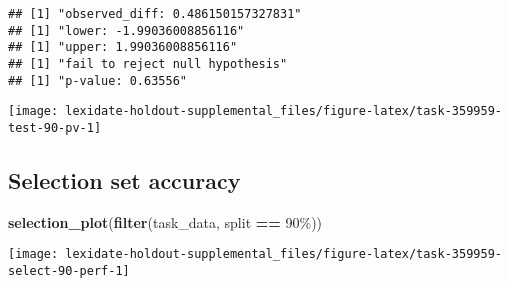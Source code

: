 \documentclass[
]{book}
\newenvironment{Shaded}{\begin{snugshade}}{\end{snugshade}}
\newcommand{\AttributeTok}[1]{\textcolor[rgb]{0.13,0.29,0.53}{#1}}
\newcommand{\DecValTok}[1]{\textcolor[rgb]{0.00,0.00,0.81}{#1}}
\newcommand{\FunctionTok}[1]{\textcolor[rgb]{0.13,0.29,0.53}{\textbf{#1}}}
\newcommand{\NormalTok}[1]{#1}
\newcommand{\OtherTok}[1]{\textcolor[rgb]{0.56,0.35,0.01}{#1}}
\newcommand{\SpecialCharTok}[1]{\textcolor[rgb]{0.81,0.36,0.00}{\textbf{#1}}}
\newcommand{\StringTok}[1]{\textcolor[rgb]{0.31,0.60,0.02}{#1}}
\begin{document}
\begin{Shaded}
\end{Shaded}

\begin{verbatim}
## [1] "observed_diff: 0.486150157327831"
## [1] "lower: -1.99036008856116"
## [1] "upper: 1.99036008856116"
## [1] "fail to reject null hypothesis"
## [1] "p-value: 0.63556"
\end{verbatim}

\texttt{[image: lexidate-holdout-supplemental\_files/figure-latex/task-359959-test-90-pv-1]}

\hypertarget{selection-set-accuracy-38}{%
\subsection{Selection set accuracy}\label{selection-set-accuracy-38}}

\begin{Shaded}
\begin{Highlighting}[]
\FunctionTok{selection\_plot}\NormalTok{(}\FunctionTok{filter}\NormalTok{(task\_data, split }\SpecialCharTok{==} \StringTok{\textquotesingle{}90\%\textquotesingle{}}\NormalTok{))}
\end{Highlighting}
\end{Shaded}

\texttt{[image: lexidate-holdout-supplemental\_files/figure-latex/task-359959-select-90-perf-1]}
\end{document}
